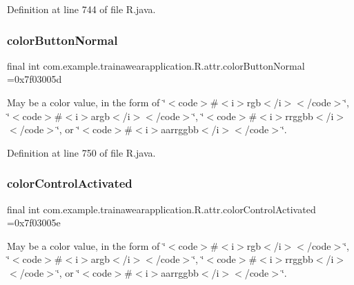 Definition at line 744 of file R.\+java.

\mbox{\label{classcom_1_1example_1_1trainawearapplication_1_1_r_1_1attr_a84b974a4663c47f452381c6a02ec7969}} 
\subsubsection{\texorpdfstring{colorButtonNormal}{colorButtonNormal}}
{\footnotesize\ttfamily final int com.\+example.\+trainawearapplication.\+R.\+attr.\+color\+Button\+Normal =0x7f03005d\hspace{0.3cm}{\ttfamily [static]}}

May be a color value, in the form of \char`\"{}$<$code$>$\#$<$i$>$rgb$<$/i$>$$<$/code$>$\char`\"{}, \char`\"{}$<$code$>$\#$<$i$>$argb$<$/i$>$$<$/code$>$\char`\"{}, \char`\"{}$<$code$>$\#$<$i$>$rrggbb$<$/i$>$$<$/code$>$\char`\"{}, or \char`\"{}$<$code$>$\#$<$i$>$aarrggbb$<$/i$>$$<$/code$>$\char`\"{}. 

Definition at line 750 of file R.\+java.

\mbox{\label{classcom_1_1example_1_1trainawearapplication_1_1_r_1_1attr_aefcb90745f0ce1778740db88039860d1}} 
\subsubsection{\texorpdfstring{colorControlActivated}{colorControlActivated}}
{\footnotesize\ttfamily final int com.\+example.\+trainawearapplication.\+R.\+attr.\+color\+Control\+Activated =0x7f03005e\hspace{0.3cm}{\ttfamily [static]}}

May be a color value, in the form of \char`\"{}$<$code$>$\#$<$i$>$rgb$<$/i$>$$<$/code$>$\char`\"{}, \char`\"{}$<$code$>$\#$<$i$>$argb$<$/i$>$$<$/code$>$\char`\"{}, \char`\"{}$<$code$>$\#$<$i$>$rrggbb$<$/i$>$$<$/code$>$\char`\"{}, or \char`\"{}$<$code$>$\#$<$i$>$aarrggbb$<$/i$>$$<$/code$>$\char`\"{}. 

